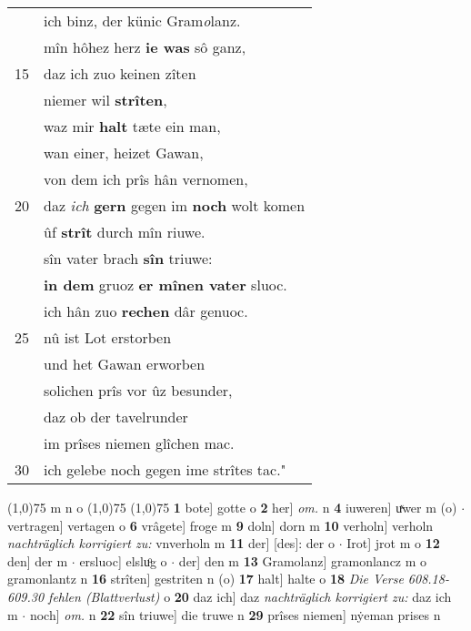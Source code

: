 \documentclass[8pt,a4paper,notitlepage]{article}
\begin{document}
\begin{table}[ht]
\begin{minipage}[t]{0.5\linewidth}
\begin{tabular}{rl}
 & ich binz, der künic Gram\textit{o}lanz.\\ 
 & mîn hôhez herz \textbf{ie was} sô ganz,\\ 
15 & daz ich zuo keinen zîten\\ 
 & niemer wil \textbf{strîten},\\ 
 & waz mir \textbf{halt} tæte ein man,\\ 
 & wan einer, heizet Gawan,\\ 
 & von dem ich prîs hân vernomen,\\ 
20 & daz \textit{ich} \textbf{gern} gegen im \textbf{noch} wolt komen\\ 
 & ûf \textbf{strît} durch mîn riuwe.\\ 
 & sîn vater brach \textbf{sîn} triuwe:\\ 
 & \textbf{in dem} gruoz \textbf{er mînen vater} sluoc.\\ 
 & ich hân zuo \textbf{rechen} dâr genuoc.\\ 
25 & nû ist Lot erstorben\\ 
 & und het Gawan erworben\\ 
 & solichen prîs vor ûz besunder,\\ 
 & daz ob der tavelrunder\\ 
 & im prîses niemen glîchen mac.\\ 
30 & ich gelebe noch gegen ime strîtes tac."\\ 
\end{tabular}
\scriptsize
\line(1,0){75} \newline
m n o \newline
\line(1,0){75} \newline
\newline
\line(1,0){75} \newline
\textbf{1} bote] gotte o \textbf{2} her] \textit{om.} n \textbf{4} iuweren] uͯwer m (o)  $\cdot$ vertragen] vertagen o \textbf{6} vrâgete] froge m \textbf{9} doln] dorn m \textbf{10} verholn] verholn \textit{nachträglich korrigiert zu:} vnverholn m \textbf{11} der] [des]: der o  $\cdot$ Irot] jrot m o \textbf{12} den] der m  $\cdot$ ersluoc] elsluͦg o  $\cdot$ der] den m \textbf{13} Gramolanz] gramonlancz m o gramonlantz n \textbf{16} strîten] gestriten n (o) \textbf{17} halt] halte o \textbf{18} \textit{Die Verse 608.18-609.30 fehlen (Blattverlust)} o  \textbf{20} daz ich] daz \textit{nachträglich korrigiert zu:} daz ich m  $\cdot$ noch] \textit{om.} n \textbf{22} sîn triuwe] die truwe n \textbf{29} prîses niemen] nẏeman prises n \newline
\end{minipage}
\end{table}
\end{document}
